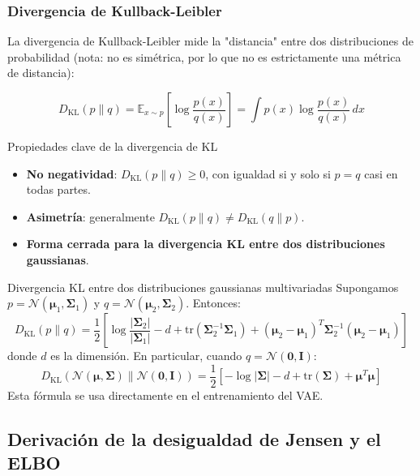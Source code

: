 \subsubsection{Divergencia de Kullback-Leibler}

La divergencia de Kullback-Leibler mide la "distancia" entre dos distribuciones de probabilidad (nota: no es simétrica, por lo que no es estrictamente una métrica de distancia):

$$D_{\mathrm{KL}}(p \| q) = \mathbb{E}_{x \sim p} \left[\log \frac{p(x)}{q(x)}\right] = \int p(x) \log \frac{p(x)}{q(x)} \, dx$$

\begin{importantbox}{Propiedades clave de la divergencia de KL}
\begin{itemize}
    \item \textbf{No negatividad}: $D_{\mathrm{KL}}(p \| q) \geq 0$, con igualdad si y solo si $p = q$ casi en todas partes.
    \item \textbf{Asimetría}: generalmente $D_{\mathrm{KL}}(p \| q) \neq D_{\mathrm{KL}}(q \| p)$.
    \item \textbf{Forma cerrada para la divergencia KL entre dos distribuciones gaussianas}.
\end{itemize}
\end{importantbox}

\begin{knowledgebox}{Divergencia KL entre dos distribuciones gaussianas multivariadas}
Supongamos $p = \mathcal{N}(\boldsymbol{\mu}_1, \boldsymbol{\Sigma}_1)$ y $q = \mathcal{N}(\boldsymbol{\mu}_2, \boldsymbol{\Sigma}_2)$. Entonces:
$$D_{\mathrm{KL}}(p \| q) = \frac{1}{2}\left[\log\frac{|\boldsymbol{\Sigma}_2|}{|\boldsymbol{\Sigma}_1|} - d + \mathrm{tr}(\boldsymbol{\Sigma}_2^{-1}\boldsymbol{\Sigma}_1) + (\boldsymbol{\mu}_2 - \boldsymbol{\mu}_1)^T \boldsymbol{\Sigma}_2^{-1} (\boldsymbol{\mu}_2 - \boldsymbol{\mu}_1)\right]$$
donde $d$ es la dimensión. En particular, cuando $q = \mathcal{N}(\mathbf{0}, \mathbf{I})$:
$$D_{\mathrm{KL}}(\mathcal{N}(\boldsymbol{\mu}, \boldsymbol{\Sigma}) \| \mathcal{N}(\mathbf{0}, \mathbf{I})) = \frac{1}{2}\left[-\log|\boldsymbol{\Sigma}| - d + \mathrm{tr}(\boldsymbol{\Sigma}) + \boldsymbol{\mu}^T\boldsymbol{\mu}\right]$$
Esta fórmula se usa directamente en el entrenamiento del VAE.
\end{knowledgebox}

\subsection{Derivación de la desigualdad de Jensen y el ELBO}

